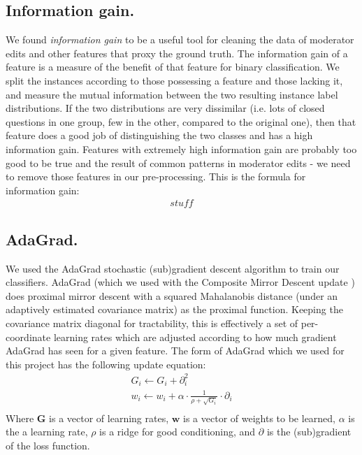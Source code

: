 \documentclass[11pt]{article}
\begin{document}
\subsection*{Information gain.}We found \emph{information gain} to be a useful tool for cleaning the data of moderator edits and other features that proxy the ground truth. The information gain of a feature is a measure of the benefit of that feature for binary classification. We split the instances according to those possessing a feature and those lacking it, and measure the mutual information between the two resulting instance label distributions. If the two distributions are very dissimilar (i.e. lots of closed questions in one group, few in the other, compared to the original one), then that feature does a good job of distinguishing the two classes and has a high information gain. Features with extremely high information gain are probably too good to be true and the result of common patterns in moderator edits - we need to remove those features in our pre-processing. This is the formula for information gain:
\begin{equation*}
\begin{split}
stuff
\end{split}
\end{equation*}
\subsection*{AdaGrad.}We used the AdaGrad \cite{duchi:11a} stochastic (sub)gradient descent algorithm to train our classifiers. AdaGrad (which we used with the Composite Mirror Descent update \cite{duchi:10a}) does proximal mirror descent with a squared Mahalanobis distance (under an adaptively estimated covariance matrix) as the proximal function. Keeping the covariance matrix diagonal for tractability, this is effectively a set of per-coordinate learning rates which are adjusted according to how much gradient AdaGrad has seen for a given feature. The form of AdaGrad which we used for this project has the following update equation:
\begin{equation*}
\begin{split}
G_i \leftarrow G_i + \partial_i^2\\
w_i \leftarrow w_i + \alpha \cdot \frac{1}{\rho + \sqrt{G_i}} \cdot \partial_i\\
\end{split}
\end{equation*}
Where $\textbf{G}$ is a vector of learning rates, $\textbf{w}$ is a vector of weights to be learned, $\alpha$ is the a learning rate, $\rho$ is a ridge for good conditioning, and $\partial$ is the (sub)gradient of the loss function.
\end{document}
